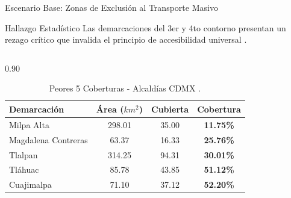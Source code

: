 \begin{frame}{Escenario Base: Zonas de Exclusión al Transporte Masivo}
    \begin{exampleblock}{Hallazgo Estadístico}
        \footnotesize Las demarcaciones del 3er y 4to contorno presentan un rezago crítico que invalida el principio de accesibilidad universal \cite{Garibaldi2024_R02, SEDATU2023}.
    \end{exampleblock}
    \begin{columns}[T]
        \begin{column}{0.90\textwidth}
            \centering
            \renewcommand{\arraystretch}{1.2} %
            \scriptsize
            \begin{table}[]
                \begin{tabular}{lccc}
                \hline
                \textbf{Demarcación} & \textbf{Área ($km^2$)} & \textbf{Cubierta} & \textbf{Cobertura} \\ \hline
                Milpa Alta           & 298.01                & 35.00             & \textbf{11.75\%}   \\
                Magdalena Contreras  & 63.37                 & 16.33             & \textbf{25.76\%}   \\
                Tlalpan              & 314.25                & 94.31             & \textbf{30.01\%}   \\
                Tláhuac              & 85.78                 & 43.85             & \textbf{51.12\%}   \\
                Cuajimalpa           & 71.10                 & 37.12             & \textbf{52.20\%}   \\ \hline
                \end{tabular}
                \caption{Peores 5 Coberturas - Alcaldías CDMX \cite{Garibaldi2024_R02}.}
            \end{table}
        \end{column}
    \end{columns}
\end{frame}

